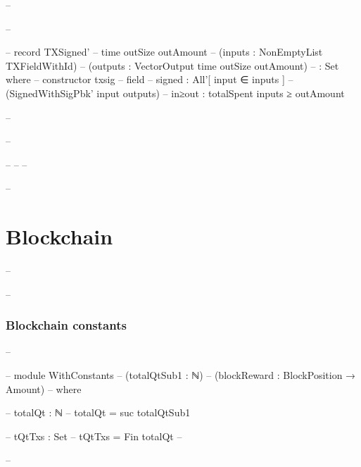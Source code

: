 \documentclass{beamer}
\begin{document}
-- \begin{frame}
-- \begin{code}

--     record TXSigned'
--       {time} {outSize} {outAmount}
--       (inputs    : NonEmptyList TXFieldWithId)
--       (outputs   : VectorOutput time outSize outAmount)
--         : Set where
--       constructor txsig
--       field
--         signed   : All'[ input ∈ inputs ]
--           (SignedWithSigPbk' input outputs)
--         in≥out : totalSpent inputs ≥ outAmount

-- \end{code}
-- \end{frame}
-- %
-- 
-- %

-- \section{Blockchain}

-- \begin{frame}
--   \frametitle{Blockchain constants}
-- \begin{code}
--     module WithConstants
--       (totalQtSub1 : ℕ)
--       (blockReward : BlockPosition → Amount)
--       where

--       totalQt : ℕ
--       totalQt = suc totalQtSub1

--       tQtTxs : Set
--       tQtTxs = Fin totalQt
-- \end{code}
-- \end{frame}
\end{document}
